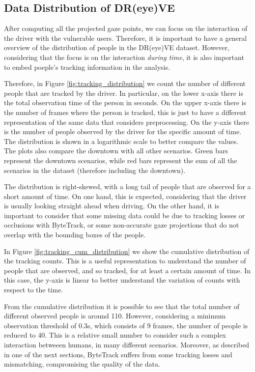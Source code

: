 \subsection{Data Distribution of DR(eye)VE}
After computing all the projected gaze points, we can focus on the interaction 
of the driver with the vulnerable users. Therefore, it is important to have 
a general overview of the distribution of people in the DR(eye)VE dataset.
However, considering that the focus is on the interaction \emph{during time},
it is also important to embed poeple's tracking information in the analysis.

Therefore, in Figure \ref{fig:tracking_distribution} we count the number of 
different people that are tracked by the driver. In particular, on the lower 
x-axis there is the total observation time of the person in seconds. On the 
upper x-axis there is the number of frames where the person is tracked, this is 
just to have a different representation of the same data that considers 
preprocessing. On the y-axis there is the number of people observed by the driver 
for the specific amount of time. The distribution is shown in a logarithmic scale 
to better compare the values.
The plots also compare the downtown with all other scenarios. Green bars 
represent the downtown scenarios, while red bars represent the sum of all 
the scenarios in the dataset (therefore including the downtown).

The distribution is right-skewed, with a long tail of people that are observed 
for a short amount of time.
On one hand, this is expected, considering that the driver is usually looking 
straight ahead when driving. On the other hand, it is important to consider 
that some missing data could be due to tracking losses or occlusions with 
ByteTrack, or some non-accurate gaze projections that do not overlap with the 
bounding boxes of the people.

In Figure \ref{fig:tracking_cum_distribution} we show the cumulative distribution 
of the tracking counts. This is a useful representation to understand the number 
of people that are observed, and so tracked, for at least a certain amount of time. 
In this case, the y-axis is linear to better understand the variation of counts 
with respect to the time.

From the cumulative distribution it is possible to see that the total number of 
different observed people is around 110. However, considering a minimum observation 
threshold of 0.3s, which consists of 9 frames, the number of people is reduced 
to 40.
This is a relative small number to consider such a complex interaction betweeen 
humans, in many different scenarios. Moreover, as described in one of the next 
sections, ByteTrack suffers from some tracking losses and mismatching, 
compromising the quality of the data.

